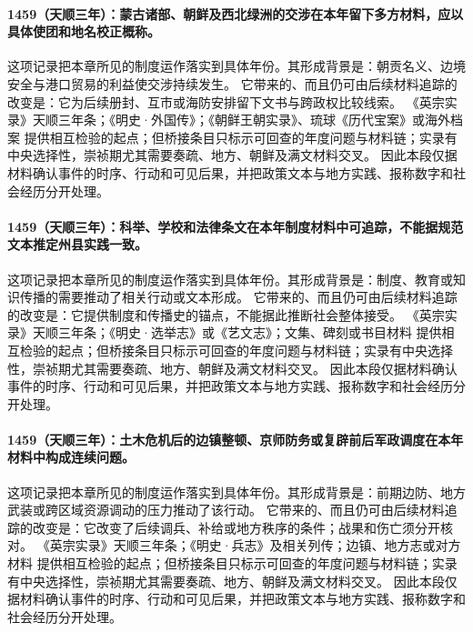 \paragraph{1459（天顺三年）：蒙古诸部、朝鲜及西北绿洲的交涉在本年留下多方材料，应以具体使团和地名校正概称。} 这项记录把本章所见的制度运作落实到具体年份。其形成背景是：朝贡名义、边境安全与港口贸易的利益使交涉持续发生。 它带来的、而且仍可由后续材料追踪的改变是：它为后续册封、互市或海防安排留下文书与跨政权比较线索。 《英宗实录》天顺三年条；《明史·外国传》；《朝鲜王朝实录》、琉球《历代宝案》或海外档案 提供相互检验的起点；但桥接条目只标示可回查的年度问题与材料链；实录有中央选择性，崇祯期尤其需要奏疏、地方、朝鲜及满文材料交叉。 因此本段仅据材料确认事件的时序、行动和可见后果，并把政策文本与地方实践、报称数字和社会经历分开处理。

\paragraph{1459（天顺三年）：科举、学校和法律条文在本年制度材料中可追踪，不能据规范文本推定州县实践一致。} 这项记录把本章所见的制度运作落实到具体年份。其形成背景是：制度、教育或知识传播的需要推动了相关行动或文本形成。 它带来的、而且仍可由后续材料追踪的改变是：它提供制度和传播史的锚点，不能据此推断社会整体接受。 《英宗实录》天顺三年条；《明史·选举志》或《艺文志》；文集、碑刻或书目材料 提供相互检验的起点；但桥接条目只标示可回查的年度问题与材料链；实录有中央选择性，崇祯期尤其需要奏疏、地方、朝鲜及满文材料交叉。 因此本段仅据材料确认事件的时序、行动和可见后果，并把政策文本与地方实践、报称数字和社会经历分开处理。

\paragraph{1459（天顺三年）：土木危机后的边镇整顿、京师防务或复辟前后军政调度在本年材料中构成连续问题。} 这项记录把本章所见的制度运作落实到具体年份。其形成背景是：前期边防、地方武装或跨区域资源调动的压力推动了该行动。 它带来的、而且仍可由后续材料追踪的改变是：它改变了后续调兵、补给或地方秩序的条件；战果和伤亡须分开核对。 《英宗实录》天顺三年条；《明史·兵志》及相关列传；边镇、地方志或对方材料 提供相互检验的起点；但桥接条目只标示可回查的年度问题与材料链；实录有中央选择性，崇祯期尤其需要奏疏、地方、朝鲜及满文材料交叉。 因此本段仅据材料确认事件的时序、行动和可见后果，并把政策文本与地方实践、报称数字和社会经历分开处理。

